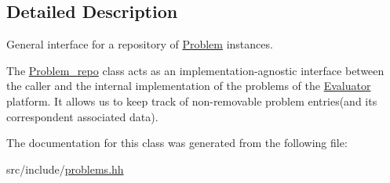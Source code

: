 \subsection{Detailed Description}
General interface for a repository of \hyperlink{classProblem}{Problem} instances. 

The \hyperlink{classProblem__repo}{Problem\+\_\+repo} class acts as an implementation-\/agnostic interface between the caller and the internal implementation of the problems of the \hyperlink{classEvaluator}{Evaluator} platform. It allows us to keep track of non-\/removable problem entries(and its correspondent associated data). 

The documentation for this class was generated from the following file\+:\begin{DoxyCompactItemize}
\item 
src/include/\hyperlink{problems_8hh}{problems.\+hh}\end{DoxyCompactItemize}
